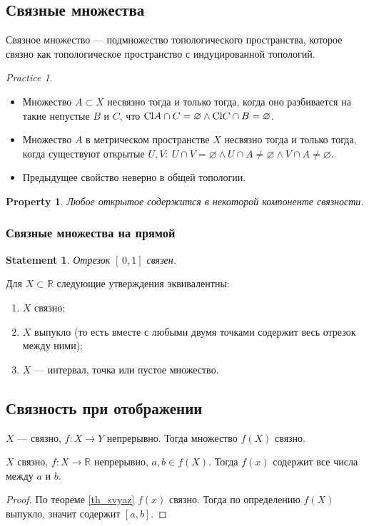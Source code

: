 \documentclass[11pt]{book}
\newcommand{\R}{\mathbb{R}}
\newcommand{\Cl}{{\mathop{\text{\rm Cl}}}}
\theoremstyle{definition}
\theoremstyle{plain}
\theoremstyle{plain}
\newtheorem*{st}{Statement}
\newtheorem*{prop}{Property}
\theoremstyle{definition}
\theoremstyle{remark}
\newtheorem*{prac}{Practice}
\begin{document}
\subsection{Связные множества}
\begin{defn}
    Связное множество --- подмножество топологического пространства, которое связно как топологическое пространство с индуцированной топологий.
\end{defn}
\begin{prac}
    $ $
    \begin{itemize}
	\item  Множество $ A \subset X$ несвязно тогда и только тогда, когда  оно разбивается на такие непустые $ B$ и  $ C$, что  $ \Cl A \cap C = \varnothing \wedge \Cl C \cap B = \varnothing$.
	\item Множество $ A$ в метрическом пространстве  $ X$ несвязно  тогда и только тогда, когда существуют открытые $ U, V: ~ U \cap V = \varnothing \wedge U \cap A \ne \varnothing \wedge V \cap A \ne  \varnothing$.
	\item Предыдущее свойство неверно в общей топологии.
    \end{itemize}
\end{prac}
\begin{prop}
    Любое открытое содержится в некоторой компоненте связности.
\end{prop}
\subsubsection{Связные множества на прямой}
\begin{st}
    Отрезок $ [\,0, 1]$ связен.
\end{st}
\begin{thm}
    Для $ X \subset \R$ следующие утверждения эквивалентны:
    $ $
    \begin{enumerate}[noitemsep,label={\rm (\arabic*)}]
	\item  $ X$  связно;
	\item  $ X$  выпукло (то есть вместе с любыми двумя точками содержит весь отрезок между ними);
	\item $ X$ --- интервал, точка или пустое множество.
    \end{enumerate}
\end{thm}
\subsection{Связность при отображении}
\begin{thm}\label{th_svyaz}
    $ X$ --- связно, $ f: X \to  Y$ непрерывно. Тогда множество $ f(X)$ связно.
\end{thm}
\begin{thm}
    $ X$ связно,  $ f: X \to  \R$ непрерывно, $ a, b \in  f(X)$.
    Тогда $ f(x)$ содержит все числа между  $ a$ и  $ b$.
\end{thm}
\begin{proof}
    По теореме \ref{th_svyaz} $ f(x) $ связно. Тогда по определению $ f(X) $ выпукло, значит содержит  $ [a, b]$.
\end{proof}
\end{document}
